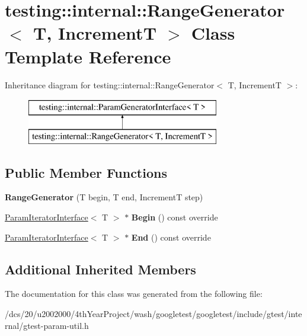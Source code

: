 \hypertarget{classtesting_1_1internal_1_1RangeGenerator}{}\section{testing\+:\+:internal\+:\+:Range\+Generator$<$ T, IncrementT $>$ Class Template Reference}
\label{classtesting_1_1internal_1_1RangeGenerator}
Inheritance diagram for testing\+:\+:internal\+:\+:Range\+Generator$<$ T, IncrementT $>$\+:\begin{figure}[H]
\begin{center}
\leavevmode
\includegraphics[height=2.000000cm]{classtesting_1_1internal_1_1RangeGenerator}
\end{center}
\end{figure}
\subsection*{Public Member Functions}
\begin{DoxyCompactItemize}
\item 
\mbox{\label{classtesting_1_1internal_1_1RangeGenerator_a5b3b83223b9cada3569bcee729e0fdf3}} 
{\bfseries Range\+Generator} (T begin, T end, IncrementT step)
\item 
\mbox{\label{classtesting_1_1internal_1_1RangeGenerator_a502913fbcf14e89d5765dfb44f3c1295}} 
\mbox{\hyperlink{classtesting_1_1internal_1_1ParamIteratorInterface}{Param\+Iterator\+Interface}}$<$ T $>$ $\ast$ {\bfseries Begin} () const override
\item 
\mbox{\label{classtesting_1_1internal_1_1RangeGenerator_ac112ca69567b9c47bf14554e0473e1e2}} 
\mbox{\hyperlink{classtesting_1_1internal_1_1ParamIteratorInterface}{Param\+Iterator\+Interface}}$<$ T $>$ $\ast$ {\bfseries End} () const override
\end{DoxyCompactItemize}
\subsection*{Additional Inherited Members}


The documentation for this class was generated from the following file\+:\begin{DoxyCompactItemize}
\item 
/dcs/20/u2002000/4th\+Year\+Project/wash/googletest/googletest/include/gtest/internal/gtest-\/param-\/util.\+h\end{DoxyCompactItemize}
